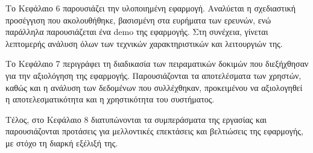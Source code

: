 		Το Κεφάλαιο 6 παρουσιάζει την υλοποιημένη εφαρμογή. Αναλύεται η σχεδιαστική προσέγγιση που ακολουθήθηκε, βασισμένη στα ευρήματα των ερευνών, ενώ παράλληλα παρουσιάζεται ένα demo της εφαρμογής. Στη συνέχεια, γίνεται λεπτομερής ανάλυση όλων των τεχνικών χαρακτηριστικών και λειτουργιών της.

		Το Κεφάλαιο 7 περιγράφει τη διαδικασία των πειραματικών δοκιμών που διεξήχθησαν για την αξιολόγηση της εφαρμογής. Παρουσιάζονται τα αποτελέσματα των χρηστών, καθώς και η ανάλυση των δεδομένων που συλλέχθηκαν, προκειμένου να αξιολογηθεί η αποτελεσματικότητα και η χρηστικότητα του συστήματος.

		Τέλος, στο Κεφάλαιο 8 διατυπώνονται τα συμπεράσματα της εργασίας και παρουσιάζονται προτάσεις για μελλοντικές επεκτάσεις και βελτιώσεις της εφαρμογής, με στόχο τη διαρκή εξέλιξή της.
